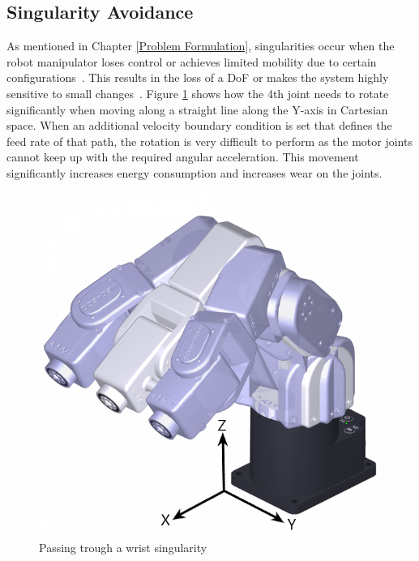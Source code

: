 \subsection{Singularity Avoidance}\label{Singularity avoidance}
As mentioned in Chapter \ref{Problem Formulation}, singularities occur when the robot manipulator loses control or achieves limited mobility due to certain configurations~\cite{Malyshev.2022}. This results in the loss of a \acrshort{DoF} or makes the system highly sensitive to small changes~\cite{Zhao.2021, Milenkovic.2021}.
Figure \ref{wristsingular} shows how the 4th joint needs to rotate significantly when moving along a straight line along the Y-axis in Cartesian space. When an additional velocity boundary condition is set that defines the feed rate of that path, the rotation is very difficult to perform as the motor joints cannot keep up with the required angular acceleration. This movement significantly increases energy consumption and increases wear on the joints. 



\begin{figure}[H]
	\centerline{\includegraphics[scale=.45]{figures/wristsingular.png}}
	\caption{Passing trough a wrist singularity~\cite{meca}}
	\label{wristsingular}
\end{figure}

